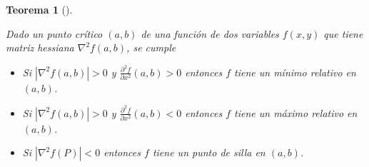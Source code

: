 \documentclass[
  a4paper,
]{scrreport}
\providecommand{\tightlist}{%
  \setlength{\itemsep}{0pt}\setlength{\parskip}{0pt}}\usepackage{longtable,booktabs,array}
\theoremstyle{definition}
\theoremstyle{plain}
\newtheorem{theorem}{Teorema}[chapter]
\theoremstyle{plain}
\theoremstyle{definition}
\theoremstyle{definition}
\theoremstyle{plain}
\theoremstyle{remark}
\begin{document}
\begin{theorem}[]\protect\hypertarget{thm-extremos-funcion-dos-variables}{}\label{thm-extremos-funcion-dos-variables}

Dado un punto crítico \((a, b)\) de una función de dos variables
\(f(x,y)\) que tiene matriz hessiana \(\nabla^2f(a,b)\), se cumple

\begin{itemize}
\tightlist
\item
  Si \(|\nabla^2 f(a,b)|>0\) y
  \(\frac{\partial^2 f}{\partial x^2}(a,b)>0\) entonces \(f\) tiene un
  \emph{mínimo relativo} en \((a,b)\).
\item
  Si \(|\nabla^2 f(a,b)|>0\) y
  \(\frac{\partial^2 f}{\partial x^2}(a,b)<0\) entonces \(f\) tiene un
  \emph{máximo relativo} en \((a,b)\).
\item
  Si \(|\nabla^2 f(P)|<0\) entonces \(f\) tiene un \emph{punto de silla}
  en \((a,b)\).
\end{itemize}

\end{theorem}
\end{document}
